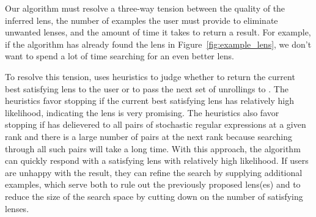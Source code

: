 \documentclass[acmsmall,screen,anonymous]{acmart}
\begin{document}
Our algorithm must resolve a three-way tension between the quality of
the inferred lens, the number of examples the user must provide to
eliminate unwanted lenses, and the amount of time it takes to return a
result.  For example, if the algorithm has already found the lens in
Figure~\ref{fig:example_lens}, we don't want to spend a lot of time
searching for an even better lens.

To resolve this tension, \RXSearch uses heuristics to judge whether to
return the current best satisfying lens to the user or to pass the
next set of unrollings to \GreedySynth.
The heuristics favor stopping if the current best satisfying
lens has relatively high likelihood, indicating the lens is very promising.
The heuristics also favor stopping if \RXSearch 
has delievered to \GreedySynth all pairs of stochastic regular
expressions at a given rank and there is a large number of pairs at the next
rank because searching through all such pairs will take a long time.
With this approach, the algorithm can quickly respond with a satisfying
lens with relatively high likelihood.  If users are unhappy with the result, they can refine the
search by supplying additional examples, which serve both to rule out
the previously proposed lens(es) and to reduce the size of the search
space by cutting down on the number of satisfying lenses.


\end{document}
